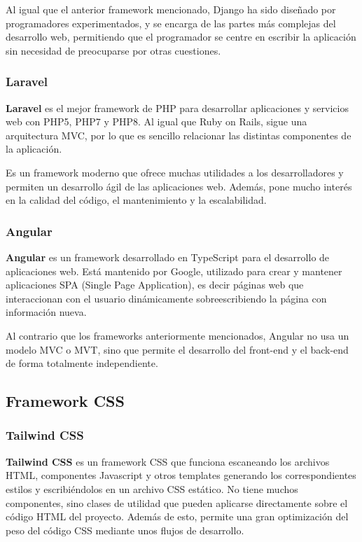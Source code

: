     Al igual que el anterior framework mencionado, Django ha sido diseñado por programadores
    experimentados, y se encarga de las partes más complejas del desarrollo web, permitiendo
    que el programador se centre en escribir la aplicación sin necesidad de preocuparse
    por otras cuestiones.

    \subsubsection{Laravel}
    \textbf{Laravel} es el mejor framework de PHP para desarrollar aplicaciones y servicios web con
    PHP5, PHP7 y PHP8. Al igual que Ruby on Rails, sigue una arquitectura MVC, por lo que es
    sencillo relacionar las distintas componentes de la aplicación.

    Es un framework moderno que ofrece muchas utilidades a los desarrolladores y permiten un
    desarrollo ágil de las aplicaciones web. Además, pone mucho interés en la calidad del
    código, el mantenimiento y la escalabilidad.

    \subsubsection{Angular}
    \textbf{Angular} es un framework desarrollado en TypeScript para el desarrollo de
    aplicaciones web. Está mantenido por Google, utilizado para crear y mantener aplicaciones
    SPA (Single Page Application), es decir páginas web que interaccionan con el usuario
    dinámicamente sobreescribiendo la página con información nueva.

    Al contrario que los frameworks anteriormente mencionados, Angular no usa un modelo MVC
    o MVT, sino que permite el desarrollo del front-end y el back-end de forma totalmente
    independiente.

\subsection{Framework CSS}

    \subsubsection{Tailwind CSS}
    \textbf{Tailwind CSS} es un framework CSS que funciona escaneando los archivos HTML,
    componentes Javascript y otros templates generando los correspondientes estilos
    y escribiéndolos en un archivo CSS estático. No tiene muchos componentes, sino clases
    de utilidad que pueden aplicarse directamente sobre el código HTML del proyecto. Además
    de esto, permite una gran optimización del peso del código CSS mediante unos flujos de
    desarrollo.

